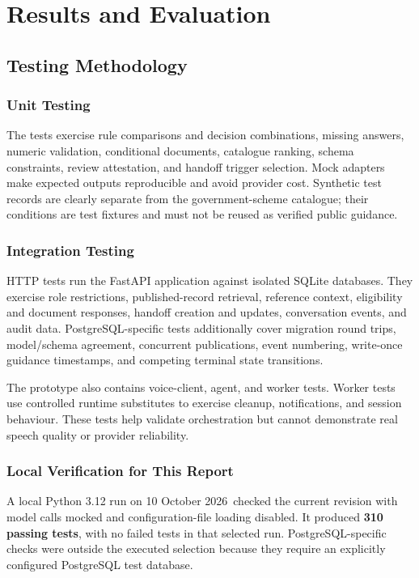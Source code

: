 \documentclass[11pt,a4paper,oneside]{report}
\newcommand{\ReportDate}{10 October 2026}
\begin{document}
\chapter{Results and Evaluation}

\section{Testing Methodology}

\subsection{Unit Testing}
The tests exercise rule comparisons and decision combinations, missing answers,
numeric validation, conditional documents, catalogue ranking, schema constraints,
review attestation, and handoff trigger selection. Mock adapters make expected
outputs reproducible and avoid provider cost. Synthetic test records are clearly
separate from the government-scheme catalogue; their conditions are test
fixtures and must not be reused as verified public guidance.

\subsection{Integration Testing}
HTTP tests run the FastAPI application against isolated SQLite databases. They
exercise role restrictions, published-record retrieval, reference context,
eligibility and document responses, handoff creation and updates, conversation
events, and audit data. PostgreSQL-specific tests additionally cover migration
round trips, model/schema agreement, concurrent publications, event numbering,
write-once guidance timestamps, and competing terminal state transitions.

The prototype also contains voice-client, agent, and worker tests. Worker tests
use controlled runtime substitutes to exercise cleanup, notifications, and
session behaviour. These tests help validate orchestration but cannot demonstrate
real speech quality or provider reliability.

\subsection{Local Verification for This Report}
A local Python 3.12 run on \ReportDate\ checked the current revision with model
calls mocked and configuration-file loading disabled. It produced
\textbf{310 passing tests}, with no failed tests in that selected run.
PostgreSQL-specific checks were outside the executed selection because they
require an explicitly configured PostgreSQL test database.
\end{document}
